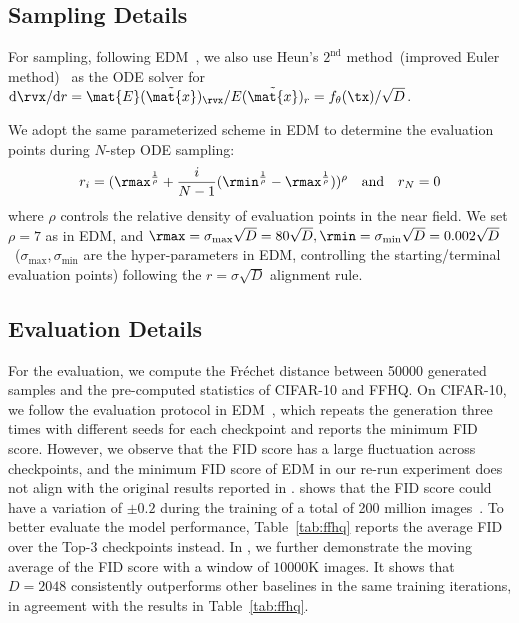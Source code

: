 \subsection{Sampling Details}

For sampling, following EDM~\cite{Karras2022ElucidatingTD}, we also use Heun's $2^{\textrm{nd}}$ method~(improved Euler method)~\cite{Ascher1998ComputerMF} as the ODE solver for $\mathrm{d}\rvx /\mathrm{d}r = \mat{E}(\tilde{\mat{x}})_\rvx /E(\tilde{\mat{x}})_{r}= f_\theta(\tx) / \sqrt{D}$.

We adopt the same parameterized scheme in EDM to determine the evaluation points during $N$-step ODE sampling:
\begin{align*}
    r_i = ({\rmax}^\frac{1}{\rho} + \frac{i}{N-1}({\rmin}^\frac{1}{\rho}-{\rmax}^\frac{1}{\rho}))^\rho \quad \textrm{and} \quad r_N=0
\end{align*}
where $\rho$ controls the relative density of evaluation points in the near field. We set $\rho=7$ as in EDM, and $\rmax=\sigma_{\textrm{max}}\sqrt{D}=80\sqrt{D}, \rmin=\sigma_{\textrm{min}}\sqrt{D}=0.002\sqrt{D}$~($\sigma_{\textrm{max}},\sigma_{\textrm{min}}$ are the hyper-parameters in EDM, controlling the starting/terminal evaluation points) following the $r=\sigma\sqrt{D}$ alignment rule.
\subsection{Evaluation Details}
\label{app:eval}
For the evaluation, we compute the Fréchet distance between 50000 generated samples and the pre-computed statistics of CIFAR-10 and FFHQ. On CIFAR-10, we follow the evaluation protocol in EDM~\cite{Karras2022ElucidatingTD}, which repeats the generation three times with different seeds for each checkpoint and reports the minimum FID score. However, we observe that the FID score has a large fluctuation across checkpoints, and the minimum FID score of EDM in our re-run experiment does not align with the original results reported in \cite{Karras2022ElucidatingTD}.  shows that the FID score could have a variation of $\pm 0.2$ during the training of a total of 200 million images~\cite{Karras2022ElucidatingTD}. To better evaluate the model performance, Table~\ref{tab:ffhq} reports the average FID over the Top-3 checkpoints instead. In , we further demonstrate the moving average of the FID score with a window of $10000$K images. It shows that $D=2048$ consistently outperforms other baselines in the same training iterations, in agreement with the results in Table~\ref{tab:ffhq}.

